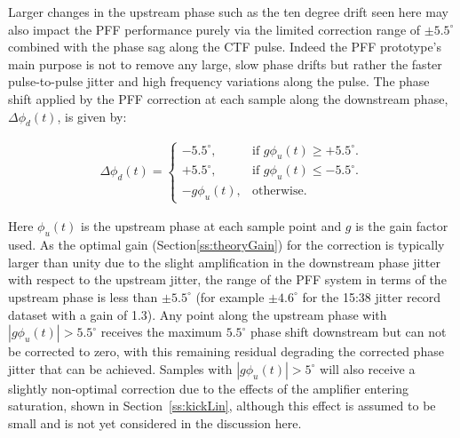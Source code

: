 Larger changes in the upstream phase such as the ten degree drift seen here may also impact the PFF performance purely via the limited correction range of \(\pm5.5^\circ\) combined with the phase sag along the CTF pulse. Indeed the PFF prototype's main purpose is not to remove any large, slow phase drifts but rather the faster pulse-to-pulse jitter and high frequency variations along the pulse. The phase shift applied by the PFF correction at each sample along the downstream phase, \(\Delta\phi_d(t)\), is given by:

\begin{eqnarray}
	\Delta\phi_d(t) = \begin{cases}
	-5.5^\circ, &  \text{if $g\phi_u(t) \geq+5.5^\circ$.}\\
	+5.5^\circ, &  \text{if $g\phi_u(t)\leq-5.5^\circ$}.\\
	-g\phi_u(t), &  \text{otherwise.}
	\end{cases}
	\label{e:limCorrection}
\end{eqnarray}

Here \(\phi_u(t)\) is the upstream phase at each sample point and \(g\) is the gain factor used. As the optimal gain (Section\ref{ss:theoryGain}) for the correction is typically larger than unity due to the slight amplification in the downstream phase jitter with respect to the upstream jitter, the range of the PFF system in terms of the upstream phase is less than \(\pm5.5^\circ\) (for example \(\pm4.6^\circ\) for the 15:38 jitter record dataset with a gain of 1.3). Any point along the upstream phase with \(|g\phi_u(t)| > 5.5^\circ\) receives the maximum \(5.5^\circ\) phase shift downstream but can not be corrected to zero, with this remaining residual degrading the corrected phase jitter that can be achieved. Samples with  \(|g\phi_u(t)| > 5^\circ\) will also receive a slightly non-optimal correction due to the effects of the amplifier entering saturation, shown in Section~\ref{ss:kickLin}, although this effect is assumed to be small and is not yet considered in the discussion here.

